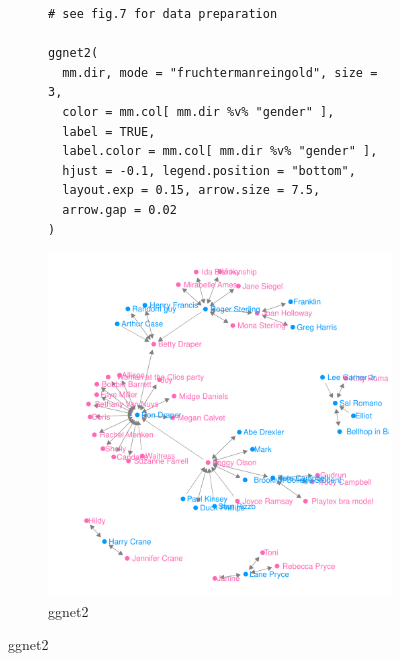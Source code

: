 \begin{figure}[hbtp]
\begin{subfigure}[t]{\textwidth}
\caption{ggnet2\label{mm2:ggnet2}}
\vspace{1em}

             \begin{adjustbox}{valign=t}

             \begin{minipage}{.49\textwidth}
 \begin{knitrout}\footnotesize
{}\color{fgcolor}\begin{kframe}
\begin{verbatim}
# see fig.7 for data preparation

ggnet2(
  mm.dir, mode = "fruchtermanreingold", size = 3,
  color = mm.col[ mm.dir %v% "gender" ],
  label = TRUE,
  label.color = mm.col[ mm.dir %v% "gender" ],
  hjust = -0.1, legend.position = "bottom",
  layout.exp = 0.15, arrow.size = 7.5,
  arrow.gap = 0.02
)
\end{verbatim}
\end{kframe}
\end{knitrout} \vspace{1em}

                   \end{minipage}

                  \begin{minipage}{.49\textwidth}

\includegraphics[width=\textwidth]{figure/madmen2_ggnet2-1.pdf}


\end{minipage}
\end{adjustbox}
\end{subfigure}
\end{figure}
